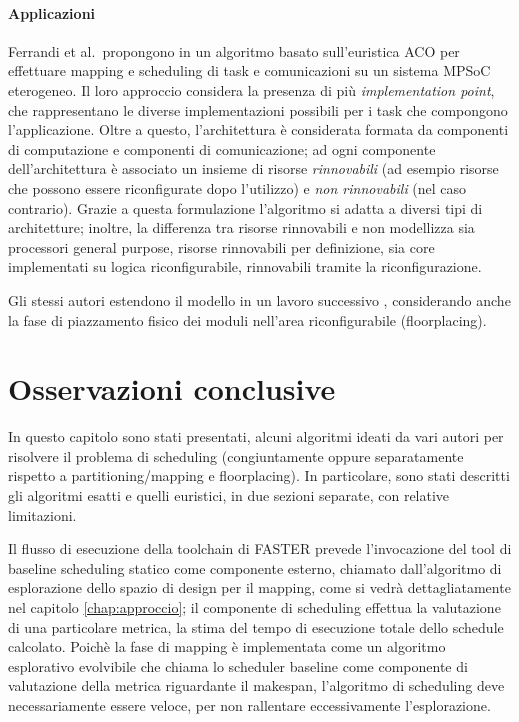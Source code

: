 \paragraph{Applicazioni}
Ferrandi et al.~propongono in \cite{AntColonyOptimization} un algoritmo basato 
sull'euristica \ac{ACO} per effettuare mapping e scheduling di task e 
comunicazioni su un sistema \ac{MPSoC} eterogeneo. Il loro approccio considera 
la presenza di più \emph{implementation point}, che rappresentano le diverse 
implementazioni possibili per i task che compongono l'applicazione. Oltre a 
questo, l'architettura è considerata formata da componenti di computazione e 
componenti di comunicazione; ad ogni componente dell'architettura è associato 
un insieme di risorse \emph{rinnovabili} (ad esempio risorse che possono essere 
riconfigurate dopo l'utilizzo) e \emph{non rinnovabili} (nel caso contrario).
Grazie a questa formulazione l'algoritmo si adatta a diversi tipi di 
architetture; inoltre, la differenza tra risorse rinnovabili e non modellizza 
sia processori general purpose, risorse rinnovabili per definizione, sia core 
implementati su logica riconfigurabile, rinnovabili tramite la riconfigurazione.

Gli stessi autori estendono il modello in un lavoro successivo
\cite{AntColonyOptimizationPlacing}, considerando anche la fase di piazzamento
fisico dei moduli nell'area riconfigurabile (floorplacing).

\section{Osservazioni conclusive}
\label{sec:osservazioniConclusiveSoA}
In questo capitolo sono stati presentati, alcuni algoritmi ideati da vari autori per risolvere
il problema di scheduling (congiuntamente oppure separatamente rispetto a
partitioning/mapping e floorplacing). In particolare, sono stati descritti gli algoritmi
esatti e quelli euristici, in due sezioni separate, con relative limitazioni.

Il flusso di esecuzione della toolchain di \ac{FASTER} prevede l'invocazione del tool di baseline
scheduling statico come componente esterno, chiamato dall'algoritmo di esplorazione dello spazio
di design per il mapping, come si vedr\`a dettagliatamente nel capitolo \ref{chap:approccio};
il componente di scheduling effettua la valutazione di una particolare
metrica, la stima del tempo di esecuzione totale dello schedule calcolato. Poichè la fase
di mapping è implementata come un algoritmo esplorativo evolvibile che chiama lo scheduler
baseline come componente di valutazione della metrica riguardante il makespan, l'algoritmo di
scheduling deve necessariamente essere veloce, per non rallentare eccessivamente l'esplorazione.

